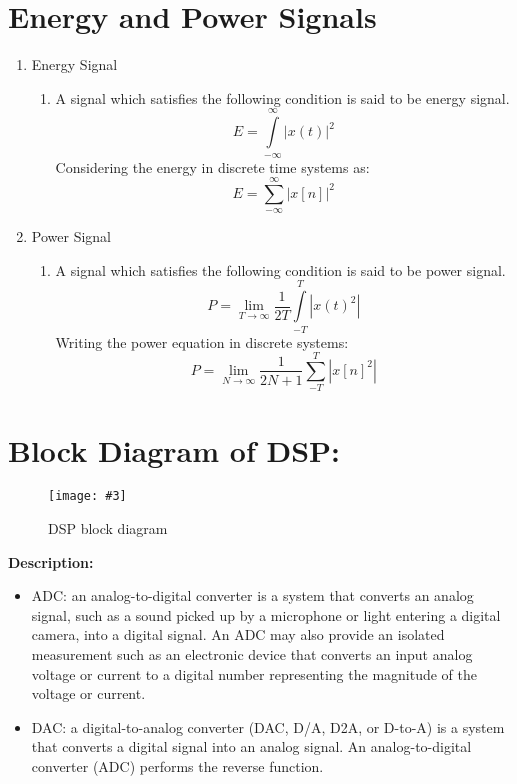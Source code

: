 \documentclass{article}
\newcommand{\addImage}[5]{
    \begin{figure}[#1]
        \centering
        \texttt{[image: \#3]}
        \caption{#4}
        \label{fig:#5}
    \end{figure}
}
\begin{document}
\begin{multicols}{2}
    \section{Energy and Power Signals}
        \begin{enumerate}
            \item Energy Signal\cite{energyPower}
                \begin{enumerate}
                    \item[] A signal which satisfies the following condition is  said to be energy signal.
                        $$ E = \int\limits_{-\infty}^{\infty} \left|x(t)\right|^2$$
                        Considering the energy in discrete time systems as:
                        $$ E = \sum\limits_{-\infty}^{\infty} \left|x[n]\right|^2$$
                \end{enumerate}
            \item Power Signal
                \begin{enumerate}
                    \item[] A signal which satisfies the following condition is  said to be power signal.
                        $$P = \lim_{T\to\infty}\frac{1}{2T} \int\limits_{-T}^{T}\left|x(t)^2\right|$$
                        Writing the power equation in discrete systems:
                        $$P = \lim_{N\to\infty}\frac{1}{2N+1} \sum\limits_{-T}^{T}\left|x[n]^2\right|$$
                \end{enumerate}
        \end{enumerate}

    \section{Block Diagram of DSP:}
        \addImage{H}{10cm}{dspBlockDiagram.jpg}{DSP block diagram\cite{blockDiagramDSP}}{dspBlockDiagram}
        \textbf{Description:} \newline
        \begin{itemize}
            \item ADC: an analog-to-digital converter is a system that 
            converts an analog signal, such as a sound picked up by a 
            microphone or light entering a digital camera, into a digital 
            signal. An ADC may also provide an isolated measurement such as an 
            electronic device that converts an input analog voltage or current 
            to a digital number representing the magnitude of the voltage or 
            current\cite{wikiADC}.
            \item DAC:  a digital-to-analog converter (DAC, D/A, D2A, or D-to-A)
            is a system that converts a digital signal into an analog signal. 
            An analog-to-digital converter (ADC) performs the reverse function.
            \cite{wikiDAC}
        \end{itemize}

\end{multicols}
\end{document}
